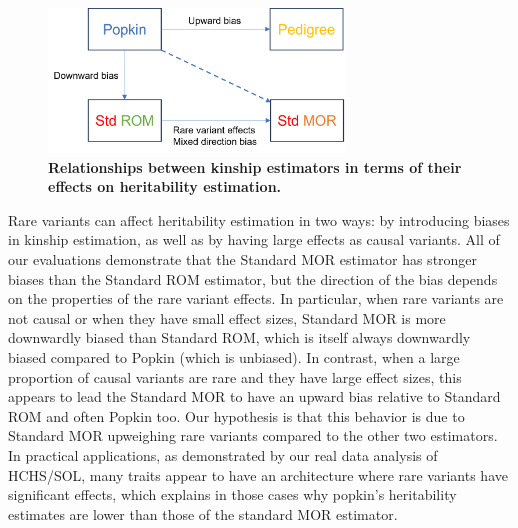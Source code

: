 \documentclass[11pt]{article}
\begin{document}
\begin{figure}[bp!]
  \centering
  \includegraphics[width=0.7\textwidth]{data/est_relationships.png}
  \caption{
    {\bf Relationships between kinship estimators in terms of their effects on heritability estimation.}
    }
  \label{fig:est_relationship}
\end{figure}

Rare variants can affect heritability estimation in two ways: by introducing biases in kinship estimation, as well as by having large effects as causal variants.
All of our evaluations demonstrate that the Standard MOR estimator has stronger biases than the Standard ROM estimator, but the direction of the bias depends on the properties of the rare variant effects.
In particular, when rare variants are not causal or when they have small effect sizes, Standard MOR is more downwardly biased than Standard ROM, which is itself always downwardly biased compared to Popkin (which is unbiased).
In contrast, when a large proportion of causal variants are rare and they have large effect sizes, this appears to lead the Standard MOR to have an upward bias relative to Standard ROM and often Popkin too.
Our hypothesis is that this behavior is due to Standard MOR upweighing rare variants compared to the other two estimators.
In practical applications, as demonstrated by our real data analysis of HCHS/SOL, many traits appear to have an architecture where rare variants have significant effects, which explains in those cases why popkin's heritability estimates are lower than those of the standard MOR estimator.
\end{document}
